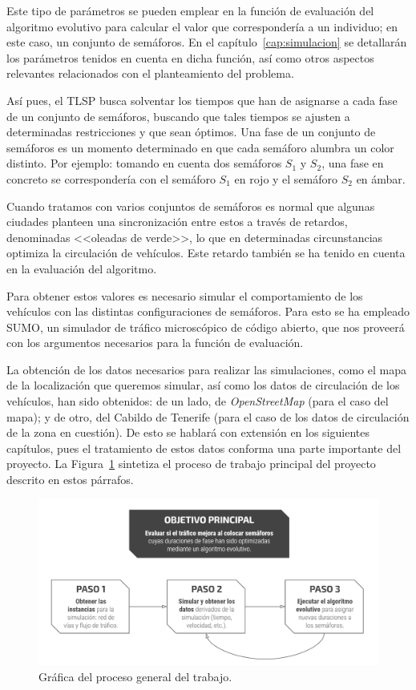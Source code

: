 Este tipo de parámetros se pueden emplear en la función de evaluación del algoritmo evolutivo para calcular el valor que correspondería a un individuo; en este caso, un conjunto de semáforos. En el capítulo~\ref{cap:simulacion} se detallarán los parámetros tenidos en cuenta en dicha función, así como otros aspectos relevantes relacionados con el planteamiento del problema.

Así pues, el TLSP busca solventar los tiempos que han de asignarse a cada fase de un conjunto de semáforos, buscando que tales tiempos se ajusten a determinadas restricciones y que sean óptimos. Una fase de un conjunto de semáforos es un momento determinado en que cada semáforo alumbra un color distinto. Por ejemplo: tomando en cuenta dos semáforos $S_1$ y $S_2$, una fase en concreto se correspondería con el semáforo $S_1$ en rojo y el semáforo $S_2$ en ámbar.

Cuando tratamos con varios conjuntos de semáforos es normal que algunas ciudades planteen una sincronización entre estos a través de retardos, denominadas <<oleadas de verde>>, lo que en determinadas circunstancias optimiza la circulación de vehículos. Este retardo también se ha tenido en cuenta en la evaluación del algoritmo.

Para obtener estos valores es necesario simular el comportamiento de los vehículos con las distintas configuraciones de semáforos. Para esto se ha empleado SUMO, un simulador de tráfico microscópico de código abierto, que nos proveerá con los argumentos necesarios para la función de evaluación.

La obtención de los datos necesarios para realizar las simulaciones, como el mapa de la localización que queremos simular, así como los datos de circulación de los vehículos, han sido obtenidos: de un lado, de \textit{OpenStreetMap} (para el caso del mapa); y de otro, del Cabildo de Tenerife (para el caso de los datos de circulación de la zona en cuestión). De esto se hablará con extensión en los siguientes capítulos, pues el tratamiento de estos datos conforma una parte importante del proyecto. La Figura~\ref{fig:evolutionary_alg_graph} sintetiza el proceso de trabajo principal del proyecto descrito en estos párrafos.


\begin{figure}[!t]
    \centering
    \includegraphics[width=\textwidth]{report/images/evolutionary_alg_graph.png}
    \caption{Gráfica del proceso general del trabajo.}
    \label{fig:evolutionary_alg_graph}
\end{figure}

